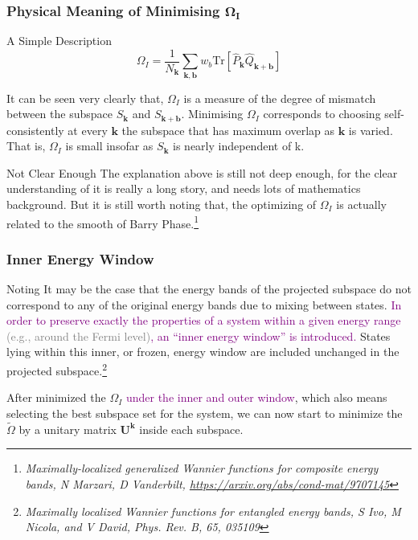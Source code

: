 \documentclass{beamer}
\begin{document}
  \begin{frame}
    \frametitle{Physical Meaning of Minimising \(\mathbf{\Omega_I}\)}

    \begin{block}{A Simple Description}
      \small
      \begin{equation*}
        \Omega_I = \dfrac{1}{N_\mathbf{k}}\sum_{\mathbf{k},\mathbf{b}}w_b{}\mathrm{Tr}\left[\widehat{P}_{\mathbf{k}}\widehat{Q}_{\mathbf{k}+\mathbf{b}} \right]
      \end{equation*}

      It can be seen very clearly that, \(\Omega_I\) is a measure of the degree of mismatch between the subspace \(S_{\mathbf{k}}\) and \(S_{\mathbf{k}+\mathbf{b}}\). {\color{purple}Minimising \(\Omega_I\) corresponds to choosing self-consistently at every \(\mathbf{k}\) the subspace that has maximum overlap as \(\mathbf{k}\) is varied.} That is, \(\Omega_I\) is small insofar as \(S_\mathbf{k}\) is nearly independent of k.
    \end{block}

    \begin{alertblock}{Not Clear Enough}
      \small
      The explanation above is still not deep enough, for the clear understanding of it is really a long story, and needs lots of mathematics background. But it is still worth noting that, the optimizing of \(\Omega_I\) is actually related to the smooth of Barry Phase.\footnote{\tiny\emph{Maximally-localized generalized Wannier functions for composite energy bands, N Marzari, D Vanderbilt, \url{https://arxiv.org/abs/cond-mat/9707145}}}
    \end{alertblock}
  \end{frame}

  \begin{frame}
    \frametitle{Inner Energy Window}

    \begin{block}{Noting}
      It may be the case that the energy bands of the projected subspace do not correspond to any of the original energy bands due to mixing between states. \textcolor{purple}{In order to preserve exactly the properties of a system within a given energy range \textcolor{gray}{(e.g., around the Fermi level)}, an ``inner energy window'' is introduced.} States lying within this inner, or frozen, energy window are included unchanged in the projected subspace.\footnote{\tiny\emph{Maximally localized Wannier functions for entangled energy bands, S Ivo, M Nicola, and V David, Phys. Rev. B, 65, 035109}}
    \end{block}

    After minimized the \(\Omega_I\) \textcolor{purple}{under the inner and outer window}, which also means selecting the best subspace set for the system, we can now start to minimize the \(\widetilde{\Omega}\) by a unitary matrix \(\mathbf{U}^{\mathbf{k}}\) inside each subspace.

  \end{frame}
\end{document}

